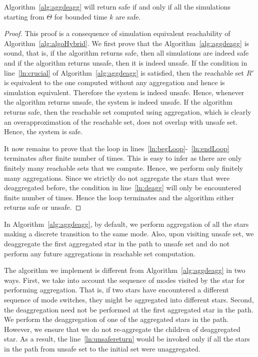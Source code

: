 \begin{lemma}
Algorithm~\ref{alg:aggdeagg} will return safe if and only if all the simulations starting from $\Theta$ for bounded time $k$ are safe.
\end{lemma}
\begin{proof}
This proof is a consequence of simulation equivalent reachability of Algorithm~\ref{alg:algoHybrid}. 
%
We first prove that the Algorithm~\ref{alg:aggdeagg} is sound, that is, if the algorithm returns safe, then all simulations are indeed safe and if the algorithm returns unsafe, then it is indeed unsafe. 
%
If the condition in line~\ref{ln:crucial} of Algorithm~\ref{alg:aggdeagg} is satisfied, then the reachable set $R'$ is equivalent to the one computed without any aggregation and hence is simulation equivalent. 
%
Therefore the system is indeed unsafe. 
%
Hence, whenever the algorithm returns unsafe, the system is indeed unsafe. 
%
If the algorithm returns safe, then the reachable set computed using aggregation, which is clearly an overapproximation of the reachable set, does not overlap with unsafe set. 
%
Hence, the system is safe. 


It now remains to prove that the loop in lines~\ref{ln:begLoop}-~\ref{ln:endLoop} terminates after finite number of times. 
%
This is easy to infer as there are only finitely many reachable sets that we compute. 
%
Hence, we perform only finitely many aggregations. 
%
Since we strictly do not aggregate the stars that were deaggregated before, the condition in line~\ref{ln:deagg} will only be encountered finite number of times. 
%
Hence the loop terminates and the algorithm either returns safe or unsafe.
\end{proof}


\begin{remark}
\label{rem:aggonly}
In Algorithm~\ref{alg:aggdeagg}, by default, we perform aggregation of all the stars making a discrete transition to the same mode. Also, upon visiting unsafe set, we deaggregate the first aggregated star in the path to unsafe set and do not perform any future aggregations in reachable set computation. 

The algorithm we implement is different from Algorithm~\ref{alg:aggdeagg} in two ways. First, we take into account the sequence of modes visited by the star for performing aggregation. That is, if two stars have encountered a different sequence of mode switches, they might be aggregated into different stars. Second, the deaggregation need not be performed at the first aggregated star in the path. We perform the deaggregation of one of the aggregated stars in the path. However, we ensure that we do not re-aggregate the children of deaggregated star. As a result, the line~\ref{ln:unsafereturn} would be invoked only if all the stars in the path from unsafe set to the initial set were unaggregated.
\end{remark}

